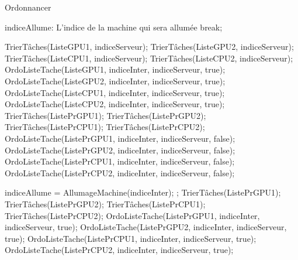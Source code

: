 \begin{algorithm}[H]
\caption{Ordonnancer}
\label{algo5}
\begin{algorithmic}[1]
\LOOP
		\STATE indiceAllume: L'indice de la machine qui sera allumée
	\STATE {}
			\STATE break;
		\ENDIF
		
		\STATE {}
		\STATE TrierTâches(ListeGPU1, indiceServeur);
		\STATE TrierTâches(ListeGPU2, indiceServeur);
		\STATE TrierTâches(ListeCPU1, indiceServeur);
		\STATE TrierTâches(ListeCPU2, indiceServeur);
		\STATE OrdoListeTache(ListeGPU1, indiceInter, indiceServeur, true);
		\STATE OrdoListeTache(ListeGPU2, indiceInter, indiceServeur, true);
		\STATE OrdoListeTache(ListeCPU1, indiceInter, indiceServeur, true);
		\STATE OrdoListeTache(ListeCPU2, indiceInter, indiceServeur, true);
		\STATE
		\STATE {}
		\STATE TrierTâches(ListePrGPU1);
		\STATE TrierTâches(ListePrGPU2);
		\STATE TrierTâches(ListePrCPU1);
		\STATE TrierTâches(ListePrCPU2);
		\STATE OrdoListeTache(ListePrGPU1, indiceInter, indiceServeur, false);
		\STATE OrdoListeTache(ListePrGPU2, indiceInter, indiceServeur, false);
		\STATE OrdoListeTache(ListePrCPU1, indiceInter, indiceServeur, false);
		\STATE OrdoListeTache(ListePrCPU2, indiceInter, indiceServeur, false);
	\ENDFOR
	
	\STATE
	\STATE {}
		\STATE indiceAllume = AllumageMachine(indiceInter);
			\STATE {}
			\RETURN;
		\ELSE
			\STATE TrierTâches(ListePrGPU1);
			\STATE TrierTâches(ListePrGPU2);
			\STATE TrierTâches(ListePrCPU1);
			\STATE TrierTâches(ListePrCPU2);
			\STATE OrdoListeTache(ListePrGPU1, indiceInter, indiceServeur, true);
			\STATE OrdoListeTache(ListePrGPU2, indiceInter, indiceServeur, true);
			\STATE OrdoListeTache(ListePrCPU1, indiceInter, indiceServeur, true);
			\STATE OrdoListeTache(ListePrCPU2, indiceInter, indiceServeur, true);
		\ENDIF
	\ENDWHILE
\ENDLOOP
\end{algorithmic}
\end{algorithm}



